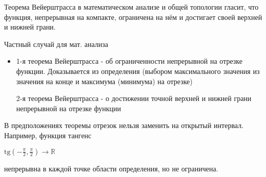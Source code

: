 Теорема Вейерштрасса в математическом анализе и общей топологии гласит, что функция, непрерывная на компакте, ограничена на нём и достигает своей верхней и нижней грани.

Частный случай для мат. анализа

\begin{itemize}
\item 
1-я теорема Вейерштрасса - об ограниченности непрерывной на отрезке функции.
Доказывается из определения (выбором максимального значения 
из значения на конце и максимума (минимума) на отрезке)

2-я теорема Вейерштрасса - о достижении точной верхней и нижней грани непрерывной на отрезке функции

\end{itemize}
В предположениях теоремы отрезок нельзя заменить на открытый интервал. Например, функция тангенс

$ \mathrm{tg} \left( -\frac{\pi}{2} , \frac{\pi}{2} \right) \to \mathbb{R} $

непрерывна в каждой точке области определения, но не ограничена.
